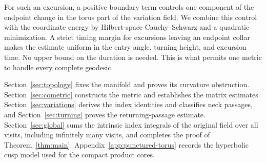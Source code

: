 For such an excursion, a positive boundary term controls one component
of the endpoint change in the torus part of the variation field.
We combine this control with the coordinate energy by Hilbert-space
Cauchy--Schwarz and a quadratic minimization. A strict timing margin
for excursions leaving an endpoint collar makes the estimate uniform
in the entry angle, turning height, and excursion time. No upper
bound on the duration is needed. This is what permits one metric to
handle every complete geodesic.

Section~\ref{sec:topology} fixes the manifold and proves its curvature
obstruction. Section~\ref{sec:cometric} constructs the metric and
establishes the matrix estimates. Section~\ref{sec:variations} derives
the index identities and classifies neck passages, and
Section~\ref{sec:turning} proves the returning-passage estimate.
Section~\ref{sec:global} sums the intrinsic index integrals of the
original field over all visits, including infinitely many visits,
and completes the proof of Theorem~\ref{thm:main}.
Appendix~\ref{app:punctured-torus} records the hyperbolic cusp model
used for the compact product cores.
